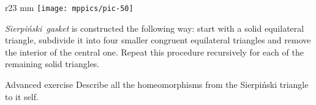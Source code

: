 {

\begin{wrapfigure}{r}{23 mm}
\vskip-4mm
\centering
\texttt{[image: mppics/pic-50]}
\end{wrapfigure}

\mbox{\emph{Sierpi\'nski gasket}} is constructed the following way:
start with a solid equilateral triangle, subdivide it into four smaller congruent equilateral triangles and remove the interior of the central one.
Repeat this procedure recursively for each of the remaining solid triangles.

}

\begin{thm}{Advanced exercise}\label{ex:sierpinski}
Describe all the homeomorphisms from the Sierpi\'nski triangle to it self.
\end{thm}
